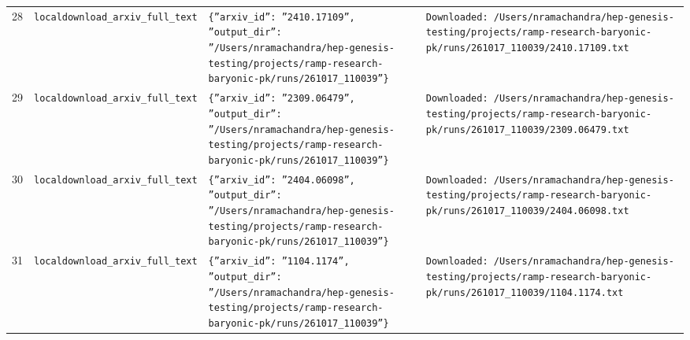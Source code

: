 \documentclass[11pt,a4paper]{article}
\begin{document}
\begin{longtable}{@{}p{}p{}p{}p{}@{}}
28 & \texttt{local}\newline\texttt{download\_\allowbreak{}arxiv\_\allowbreak{}full\_\allowbreak{}text} & \texttt{\{''arxiv\_\allowbreak{}id'':\allowbreak{} ''2410.17109'',\allowbreak{} ''output\_\allowbreak{}dir'':\allowbreak{} ''/\allowbreak{}Users/\allowbreak{}nramachandra/\allowbreak{}hep-genesis-testing/\allowbreak{}projects/\allowbreak{}ramp-research-baryonic-pk/\allowbreak{}runs/\allowbreak{}261017\_\allowbreak{}110039''\}\allowbreak{}} & \texttt{Downloaded:\allowbreak{} /\allowbreak{}Users/\allowbreak{}nramachandra/\allowbreak{}hep-genesis-testing/\allowbreak{}projects/\allowbreak{}ramp-research-baryonic-pk/\allowbreak{}runs/\allowbreak{}261017\_\allowbreak{}110039/\allowbreak{}2410.17109.txt} \\
29 & \texttt{local}\newline\texttt{download\_\allowbreak{}arxiv\_\allowbreak{}full\_\allowbreak{}text} & \texttt{\{''arxiv\_\allowbreak{}id'':\allowbreak{} ''2309.06479'',\allowbreak{} ''output\_\allowbreak{}dir'':\allowbreak{} ''/\allowbreak{}Users/\allowbreak{}nramachandra/\allowbreak{}hep-genesis-testing/\allowbreak{}projects/\allowbreak{}ramp-research-baryonic-pk/\allowbreak{}runs/\allowbreak{}261017\_\allowbreak{}110039''\}\allowbreak{}} & \texttt{Downloaded:\allowbreak{} /\allowbreak{}Users/\allowbreak{}nramachandra/\allowbreak{}hep-genesis-testing/\allowbreak{}projects/\allowbreak{}ramp-research-baryonic-pk/\allowbreak{}runs/\allowbreak{}261017\_\allowbreak{}110039/\allowbreak{}2309.06479.txt} \\
30 & \texttt{local}\newline\texttt{download\_\allowbreak{}arxiv\_\allowbreak{}full\_\allowbreak{}text} & \texttt{\{''arxiv\_\allowbreak{}id'':\allowbreak{} ''2404.06098'',\allowbreak{} ''output\_\allowbreak{}dir'':\allowbreak{} ''/\allowbreak{}Users/\allowbreak{}nramachandra/\allowbreak{}hep-genesis-testing/\allowbreak{}projects/\allowbreak{}ramp-research-baryonic-pk/\allowbreak{}runs/\allowbreak{}261017\_\allowbreak{}110039''\}\allowbreak{}} & \texttt{Downloaded:\allowbreak{} /\allowbreak{}Users/\allowbreak{}nramachandra/\allowbreak{}hep-genesis-testing/\allowbreak{}projects/\allowbreak{}ramp-research-baryonic-pk/\allowbreak{}runs/\allowbreak{}261017\_\allowbreak{}110039/\allowbreak{}2404.06098.txt} \\
31 & \texttt{local}\newline\texttt{download\_\allowbreak{}arxiv\_\allowbreak{}full\_\allowbreak{}text} & \texttt{\{''arxiv\_\allowbreak{}id'':\allowbreak{} ''1104.1174'',\allowbreak{} ''output\_\allowbreak{}dir'':\allowbreak{} ''/\allowbreak{}Users/\allowbreak{}nramachandra/\allowbreak{}hep-genesis-testing/\allowbreak{}projects/\allowbreak{}ramp-research-baryonic-pk/\allowbreak{}runs/\allowbreak{}261017\_\allowbreak{}110039''\}\allowbreak{}} & \texttt{Downloaded:\allowbreak{} /\allowbreak{}Users/\allowbreak{}nramachandra/\allowbreak{}hep-genesis-testing/\allowbreak{}projects/\allowbreak{}ramp-research-baryonic-pk/\allowbreak{}runs/\allowbreak{}261017\_\allowbreak{}110039/\allowbreak{}1104.1174.txt} \\

\end{longtable}
\end{document}
